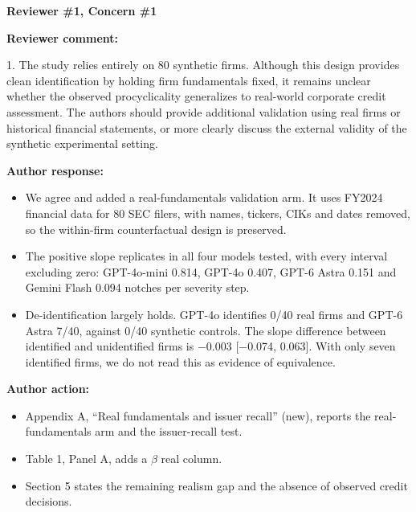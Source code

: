 \documentclass[11pt]{article}
\newcommand{\rvcomment}[1]{{\color{ReviewerGreen}#1}}
\newcommand{\concern}[1]{\textbf{\color{ReviewerGreen}#1}}
\begin{document}
\vspace{12pt}
\concern{Reviewer \#1, Concern \#1}

\concern{Reviewer comment:}

\rvcomment{1. The study relies entirely on 80 synthetic firms. Although this design provides clean identification by holding firm fundamentals fixed, it remains unclear whether the observed procyclicality generalizes to real-world corporate credit assessment. The authors should provide additional validation using real firms or historical financial statements, or more clearly discuss the external validity of the synthetic experimental setting.}

\textbf{Author response:}

\begin{itemize}

\item We agree and added a real-fundamentals validation arm. It uses FY2024 financial data for 80 SEC filers, with names, tickers, CIKs and dates removed, so the within-firm counterfactual design is preserved.

\item The positive slope replicates in all four models tested, with every interval excluding zero: GPT-4o-mini 0.814, GPT-4o 0.407, GPT-6 Astra 0.151 and Gemini Flash 0.094 notches per severity step.

\item De-identification largely holds. GPT-4o identifies 0/40 real firms and GPT-6 Astra 7/40, against 0/40 synthetic controls. The slope difference between identified and unidentified firms is $-$0.003 [$-$0.074, 0.063]. With only seven identified firms, we do not read this as evidence of equivalence.

\end{itemize}

\textbf{Author action:}

\begin{itemize}

\item Appendix A, ``Real fundamentals and issuer recall'' (new), reports the real-fundamentals arm and the issuer-recall test.

\item Table 1, Panel A, adds a $\beta$ real column.

\item Section 5 states the remaining realism gap and the absence of observed credit decisions.

\end{itemize}
\end{document}
